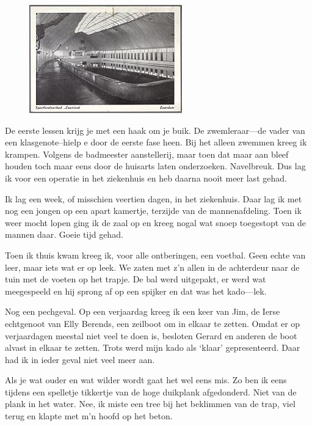 \documentclass[12pt,twoside]{memoir}
\begin{document}
\begin{figure}
\includegraphics[width=\textwidth]{img/ch11/sportbad}
\end{figure}

De eerste lessen krijg je met een haak om je buik. De zwemleraar---de vader van een klasgenote--hielp e door de eerste fase heen. Bij het alleen zwemmen kreeg ik krampen. Volgens de badmeester aanstellerij, maar toen dat maar aan bleef houden toch maar eens door de huisarts laten onderzoeken. Navelbreuk. Dus lag ik voor een operatie in het ziekenhuis en heb daarna nooit meer last gehad.

Ik lag een week, of misschien veertien dagen, in het ziekenhuis. Daar lag ik met nog een jongen op een apart kamertje, terzijde van de mannenafdeling. Toen ik weer mocht lopen ging ik de zaal op en kreeg nogal wat snoep toegestopt van de mannen daar. Goeie tijd gehad.

Toen ik thuis kwam kreeg ik, voor alle ontberingen, een voetbal. Geen echte van leer, maar iets wat er op leek. We zaten met z’n allen in de achterdeur naar de tuin met de voeten op het trapje. De bal werd uitgepakt, er werd wat meegespeeld en hij sprong af op een spijker en dat was het kado---lek. 

Nog een pechgeval. Op een verjaardag kreeg ik een keer van Jim, de Ierse echtgenoot van Elly Berends, een zeilboot om in elkaar te zetten. Omdat er op verjaardagen meestal niet veel te doen is, besloten Gerard en anderen de boot alvast in elkaar te zetten. Trots werd mijn kado als ‘klaar’ gepresenteerd. Daar had ik in ieder geval niet veel meer aan.

Als je wat ouder en wat wilder wordt gaat het wel eens mis. Zo ben ik eens tijdens een spelletje tikkertje van de hoge duikplank afgedonderd. Niet van de plank in het water. Nee, ik miste een tree bij het beklimmen van de trap, viel terug en klapte met m’n hoofd op het beton. 
\end{document}
